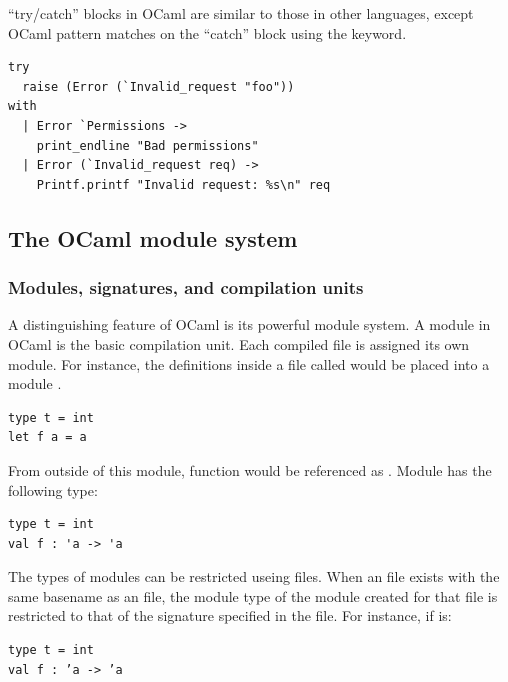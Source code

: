 ``try/catch'' blocks in OCaml are similar to those in other languages,
except OCaml pattern matches on the ``catch'' block using the
 keyword.

\begin{lstlisting}
try
  raise (Error (`Invalid_request "foo"))
with
  | Error `Permissions ->
    print_endline "Bad permissions"
  | Error (`Invalid_request req) ->
    Printf.printf "Invalid request: %s\n" req
\end{lstlisting}

\subsection{The OCaml module system}

\subsubsection{Modules, signatures, and compilation units}

A distinguishing feature of OCaml is its powerful module system. A
module in OCaml is the basic compilation unit. Each compiled file is
assigned its own module. For instance, the definitions inside a file
called  would be placed into a module .

\begin{lstlisting}
type t = int
let f a = a
\end{lstlisting}

From outside of this module, function  would be referenced as
. Module  has the following type:

\begin{lstlisting}
type t = int
val f : 'a -> 'a
\end{lstlisting}

The types of modules can be restricted useing  files. When
an  file exists with the same basename as an  file,
the module type of the module created for that  file is
restricted to that of the signature specified in the 
file. For instance, if  is:

%
\begin{lstlisting}
type t = int
val f : ’a -> ’a
\end{lstlisting}

